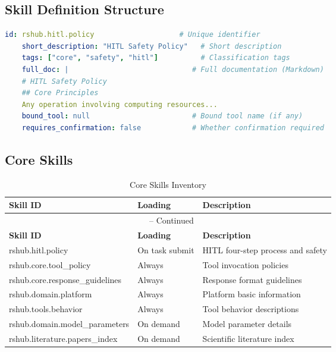\subsection{Skill Definition Structure}

\begin{lstlisting}[language=YAML, caption=Skill YAML Schema, basicstyle=\ttfamily\scriptsize]
	id: rshub.hitl.policy                    # Unique identifier
	short_description: "HITL Safety Policy"   # Short description
	tags: ["core", "safety", "hitl"]          # Classification tags
	full_doc: |                             # Full documentation (Markdown)
	# HITL Safety Policy
	## Core Principles
	Any operation involving computing resources...
	bound_tool: null                        # Bound tool name (if any)
	requires_confirmation: false            # Whether confirmation required
\end{lstlisting}

\subsection{Core Skills}

\begin{longtable}{@{}p{5.5cm}p{2.8cm}p{5.2cm}@{}}
	\caption{Core Skills Inventory} \\
	\toprule
	\textbf{Skill ID} & \textbf{Loading} & \textbf{Description} \\
	\midrule
	\endfirsthead
	\multicolumn{3}{c}{\tablename\ \thetable{} -- Continued} \\
	\toprule
	\textbf{Skill ID} & \textbf{Loading} & \textbf{Description} \\
	\midrule
	\endhead
	\bottomrule
	\endfoot
	rshub.hitl.policy & On task submit & HITL four-step process and safety \\
	rshub.core.tool\_policy & Always & Tool invocation policies \\
	rshub.core.response\_guidelines & Always & Response format guidelines \\
	rshub.domain.platform & Always & Platform basic information \\
	rshub.tools.behavior & Always & Tool behavior descriptions \\
	rshub.domain.model\_parameters & On demand & Model parameter details \\
	rshub.literature.papers\_index & On demand & Scientific literature index \\
\end{longtable}

